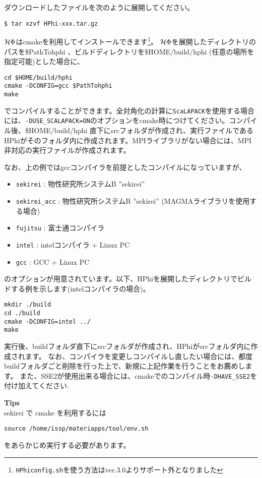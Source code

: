ダウンロードしたファイルを次のように展開してください。
\begin{verbatim}
$ tar xzvf HPhi-xxx.tar.gz
\end{verbatim}

$\mathcal{H} \Phi$はcmakeを利用してインストールできます\footnote{\texttt{HPhiconfig.sh}を使う方法はver.3.0よりサポート外となりました}。
$\mathcal{H} \Phi$を展開したディレクトリのパスを\$PathTohphi 、ビルドディレクトリを\$HOME/build/hphi (任意の場所を指定可能)とした場合に、
\begin{verbatim}
cd $HOME/build/hphi
cmake -DCONFIG=gcc $PathTohphi
make
\end{verbatim}
でコンパイルすることができます。全対角化の計算に\verb|ScaLAPACK|を使用する場合には、\verb|-DUSE_SCALAPACK=ON|のオプションをcmake時につけてください。コンパイル後、\$HOME/build/hphi 直下にsrcフォルダが作成され、実行ファイルであるHPhiがそのフォルダ内に作成されます。MPIライブラリがない場合には、MPI非対応の実行ファイルが作成されます。

なお、上の例ではgccコンパイラを前提としたコンパイルになっていますが、
\begin{itemize}
\item \verb|sekirei| : 物性研究所システムB ''sekirei''
\item \verb|sekirei_acc| : 物性研究所システムB ''sekirei'' (MAGMAライブラリを使用する場合)
\item \verb|fujitsu| : 富士通コンパイラ
\item \verb|intel| : intelコンパイラ + Linux PC
\item \verb|gcc| : GCC + Linux PC
\end{itemize}
のオプションが用意されています。以下、HPhiを展開したディレクトリでビルドする例を示します(intelコンパイラの場合)。
\begin{verbatim}
mkdir ./build
cd ./build
cmake -DCONFIG=intel ../
make
\end{verbatim}
実行後、buildフォルダ直下にsrcフォルダが作成され、HPhiがsrcフォルダ内に作成されます。
なお、コンパイラを変更しコンパイルし直したい場合には、都度buildフォルダごと削除を行った上で、新規に上記作業を行うことをお薦めします。
また、SSE2が使用出来る場合には、cmakeでのコンパイル時\verb$-DHAVE_SSE2$を付け加えてください.

\Large 
\begin{screen}
{\bf Tips}
\normalsize\\
sekirei で cmake を利用するには
\begin{verbatim}
source /home/issp/materiapps/tool/env.sh
\end{verbatim}
をあらかじめ実行する必要があります。
\end{screen}

